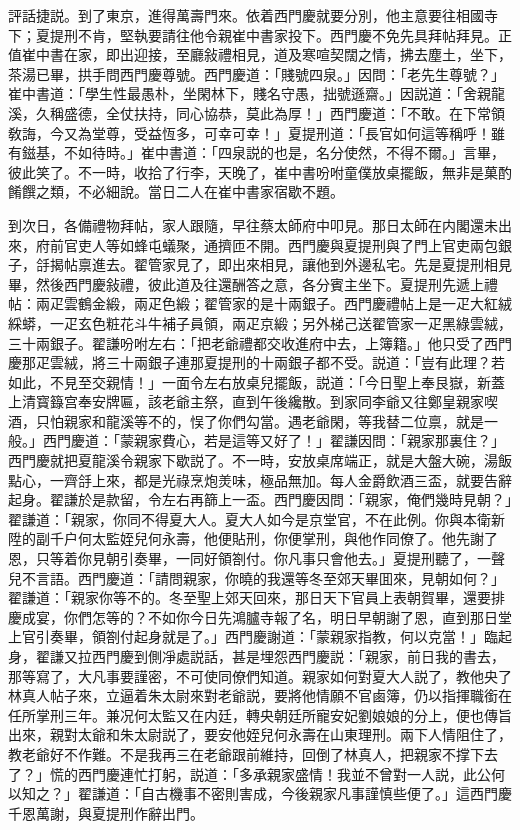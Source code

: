 評話捷説。到了東京，進得萬壽門來。依着西門慶就要分別，他主意要往相國寺下；夏提刑不肯，堅執要請往他令親崔中書家投下。西門慶不免先具拜帖拜見。正值崔中書在家，即出迎接，至廳敍禮相見，道及寒喧契闊之情，拂去塵土，坐下，茶湯已畢，拱手問西門慶尊號。西門慶道：「賤號四泉。」因問：「老先生尊號？」崔中書道：「學生性最愚朴，坐閑林下，賤名守愚，拙號遜齋。」因説道：「舍親龍溪，久稱盛德，全仗扶持，同心協恭，莫此為厚！」西門慶道：「不敢。在下常領敎誨，今又為堂尊，受益恆多，可幸可幸！」夏提刑道：「長官如何這等稱呼！雖有鎡基，不如待時。」崔中書道：「四泉説的也是，名分使然，不得不爾。」言畢，彼此笑了。不一時，收拾了行李，天晚了，崔中書吩咐童僕放桌擺飯，無非是菓酌餚饌之類，不必細說。當日二人在崔中書家宿歇不題。

到次日，各備禮物拜帖，家人跟隨，早往蔡太師府中叩見。那日太師在内閣還未出來，府前官吏人等如蜂屯蟻聚，通擠匝不開。西門慶與夏提刑與了門上官吏兩包銀子，㧱揭帖禀進去。翟管家見了，即出來相見，讓他到外邊私宅。先是夏提刑相見畢，然後西門慶敍禮，彼此道及往還酬答之意，各分賓主坐下。夏提刑先遞上禮帖：兩疋雲鶴金緞，兩疋色緞；翟管家的是十兩銀子。西門慶禮帖上是一疋大紅絨綵蟒，一疋玄色粧花斗牛補子員領，兩疋京緞；另外梯己送翟管家一疋黑綠雲絨，三十兩銀子。翟謙吩咐左右：「把老爺禮都交收進府中去，上簿籍。」他只受了西門慶那疋雲絨，將三十兩銀子連那夏提刑的十兩銀子都不受。説道：「豈有此理？若如此，不見至交親情！」一面令左右放桌兒擺飯，説道：「今日聖上奉艮嶽，新蓋上清寳籙宫奉安牌匾，該老爺主祭，直到午後纔散。到家同李爺又往鄭皇親家喫酒，只怕親家和龍溪等不的，悮了你們勾當。遇老爺閑，等我替二位禀，就是一般。」西門慶道：「蒙親家費心，若是這等又好了！」翟謙因問：「親家那裏住？」西門慶就把夏龍溪令親家下歇説了。不一時，安放桌席端正，就是大盤大碗，湯飯點心，一齊㧱上來，都是光祿烹炮羙味，極品無加。每人金爵飲酒三盃，就要告辭起身。翟謙於是款留，令左右再篩上一盃。西門慶因問：「親家，俺們幾時見朝？」翟謙道：「親家，你同不得夏大人。夏大人如今是京堂官，不在此例。你與本衛新陞的副千户何太監姪兒何永壽，他便貼刑，你便掌刑，與他作同僚了。他先謝了恩，只等着你見朝引奏畢，一同好領劄付。你凡事只會他去。」夏提刑聽了，一聲兒不言語。西門慶道：「請問親家，你曉的我還等冬至郊天畢囬來，見朝如何？」翟謙道：「親家你等不的。冬至聖上郊天回來，那日天下官員上表朝賀畢，還要排慶成宴，你們怎等的？不如你今日先鴻臚寺報了名，明日早朝謝了恩，直到那日堂上官引奏畢，領劄付起身就是了。」西門慶謝道：「蒙親家指教，何以克當！」臨起身，翟謙又拉西門慶到側凈處説話，甚是埋怨西門慶説：「親家，前日我的書去，那等寫了，大凡事要謹密，不可使同僚們知道。親家如何對夏大人説了，教他央了林真人帖子來，立逼着朱太尉來對老爺説，要將他情願不官鹵簿，仍以指揮職銜在任所掌刑三年。兼况何太監又在内廷，轉央朝廷所寵安妃劉娘娘的分上，便也傳旨出來，親對太爺和朱太尉説了，要安他姪兒何永壽在山東理刑。兩下人情阻住了，教老爺好不作難。不是我再三在老爺跟前維持，回倒了林真人，把親家不撑下去了？」慌的西門慶連忙打躬，説道：「多承親家盛情！我並不曾對一人説，此公何以知之？」翟謙道：「自古機事不密則害成，今後親家凡事謹慎些便了。」這西門慶千恩萬謝，與夏提刑作辭出門。

